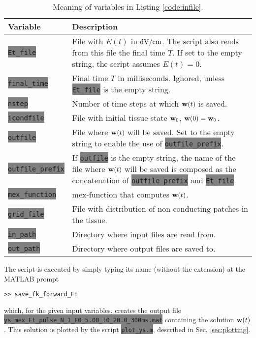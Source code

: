 \documentclass{article}
\newcommand{\code}[1]{\colorbox{gray}{\lstinline|#1|}}
\begin{document}
 

\begin{table}[h]
  \centering
  \begin{tabular}{|l|p{10cm}|}
    \hline
    {\bf Variable} & {\bf Description} \\ \hline
    \code{Et_file} & File with $E(t)$ in ${\rm dV}/{\rm cm}$. The script also reads from this file the final time $T$. If set to the empty string, the script assumes $E(t) = 0$. \\ \hline
    \code{final_time} & Final time $T$  in milliseconds. Ignored, unless \code{Et_file} is the empty string. \\ \hline
    \code{nstep} & Number of time steps at which ${\bf w}(t)$ is saved. \\ \hline
    \code{icondfile} & File with initial tissue state ${\bf w}_0$, ${\bf w}(0) = {\bf w}_0$. \\ \hline
    \code{outfile} & File where ${\bf w}(t)$ will be saved. Set to the empty string to enable the use of \code{outfile_prefix}. \\ \hline
    \code{outfile_prefix} & If \code{outfile} is the empty string, the name of the file where ${\bf w}(t)$ will be saved is composed as the concatenation of  \code{outfile_prefix} and \code{Et_file}.\\ \hline
    \code{mex_function} & mex-function that computes ${\bf w}(t)$.\\ \hline
    \code{grid_file} & File with distribution of non-conducting patches in the tissue.\\ \hline
    \code{in_path} & Directory where input files are read from.\\ \hline
    \code{out_path} & Directory where output files are saved to.\\ \hline
  \end{tabular}
  \caption{Meaning of variables in Listing \ref{code:infile}.}
  \label{tab:input}
\end{table}
The script is executed by simply typing its name (without the extension) at the MATLAB prompt
\begin{lstlisting}
>> save_fk_forward_Et
\end{lstlisting}
which, for the given input variables, creates the output file \code{ys_mex_Et_pulse_N_1_E0_5.00_t0_20.0_300ms.mat} containing the solution ${\bf w}(t)$. This solution is plotted by the script \code{plot_ys.m}, described in Sec. \ref{sec:plotting}.
\end{document}
